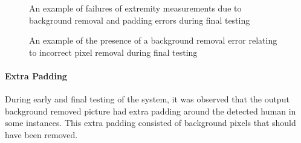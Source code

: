 \begin{figure}[ht]
	\centering
	{%
		\setlength{\fboxsep}{0pt}%
		\setlength{\fboxrule}{1pt}%
		}
	\caption{An example of failures of extremity measurements due to background removal and padding errors during final testing}
	\label{fig:volunteer1Back}
\end{figure}

\begin{figure}[ht]
	\centering
	{%
		\setlength{\fboxsep}{0pt}%
		\setlength{\fboxrule}{1pt}%
		}
	\caption{An example of the presence of a background removal error relating to incorrect pixel removal during final testing}
	\label{fig:volunteer7Back}
\end{figure}

\paragraph{Extra Padding}
During early and final testing of the system, it was observed that the output background removed picture had extra padding around the detected human in some instances. This extra padding consisted of background pixels that should have been removed. 

